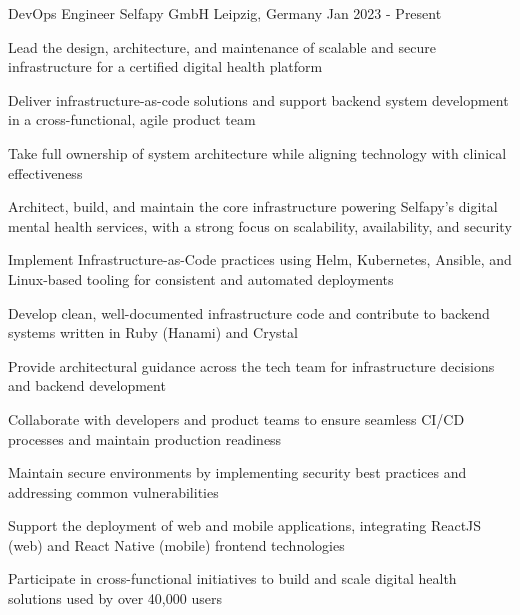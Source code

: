 
\begin{cventries}

  \cventry
    {DevOps Engineer} %
    {Selfapy GmbH} %
    {Leipzig, Germany} %
    {Jan 2023 - Present} %
    {
      \begin{cvitems} %
        \item {Lead the design, architecture, and maintenance of scalable and secure infrastructure for a certified digital health platform}
        \item {Deliver infrastructure-as-code solutions and support backend system development in a cross-functional, agile product team}
        \item {Take full ownership of system architecture while aligning technology with clinical effectiveness}
        \item {Architect, build, and maintain the core infrastructure powering Selfapy's digital mental health services, with a strong focus on scalability, availability, and security}
        \item {Implement Infrastructure-as-Code practices using Helm, Kubernetes, Ansible, and Linux-based tooling for consistent and automated deployments}
        \item {Develop clean, well-documented infrastructure code and contribute to backend systems written in Ruby (Hanami) and Crystal}
        \item {Provide architectural guidance across the tech team for infrastructure decisions and backend development}
        \item {Collaborate with developers and product teams to ensure seamless CI/CD processes and maintain production readiness}
        \item {Maintain secure environments by implementing security best practices and addressing common vulnerabilities}
        \item {Support the deployment of web and mobile applications, integrating ReactJS (web) and React Native (mobile) frontend technologies}
        \item {Participate in cross-functional initiatives to build and scale digital health solutions used by over 40,000 users}\\
      \end{cvitems}
    }


\end{cventries}
